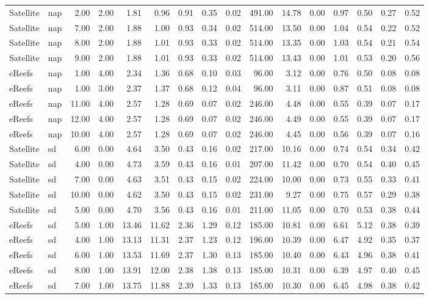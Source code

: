 \begin{table}[ht]
\begin{tabular}{llrrrrrrrrrrrrrr}
  Satellite & nap & 2.00 & 2.00 & 1.81 & 0.96 & 0.91 & 0.35 & 0.02 & 491.00 & 14.78 & 0.00 & 0.97 & 0.50 & 0.27 & 0.52 \\ 
  Satellite & nap & 7.00 & 2.00 & 1.88 & 1.00 & 0.93 & 0.34 & 0.02 & 514.00 & 13.50 & 0.00 & 1.04 & 0.54 & 0.22 & 0.52 \\ 
  Satellite & nap & 8.00 & 2.00 & 1.88 & 1.01 & 0.93 & 0.33 & 0.02 & 514.00 & 13.35 & 0.00 & 1.03 & 0.54 & 0.21 & 0.54 \\ 
  Satellite & nap & 9.00 & 2.00 & 1.88 & 1.01 & 0.93 & 0.33 & 0.02 & 514.00 & 13.43 & 0.00 & 1.01 & 0.53 & 0.20 & 0.56 \\ 
  eReefs & nap & 1.00 & 4.00 & 2.34 & 1.36 & 0.68 & 0.10 & 0.03 & 96.00 & 3.12 & 0.00 & 0.76 & 0.50 & 0.08 & 0.08 \\ 
  eReefs & nap & 1.00 & 3.00 & 2.37 & 1.37 & 0.68 & 0.12 & 0.04 & 96.00 & 3.11 & 0.00 & 0.87 & 0.51 & 0.08 & 0.08 \\ 
  eReefs & nap & 11.00 & 4.00 & 2.57 & 1.28 & 0.69 & 0.07 & 0.02 & 246.00 & 4.48 & 0.00 & 0.55 & 0.39 & 0.07 & 0.17 \\ 
  eReefs & nap & 12.00 & 4.00 & 2.57 & 1.28 & 0.69 & 0.07 & 0.02 & 246.00 & 4.49 & 0.00 & 0.55 & 0.39 & 0.07 & 0.17 \\ 
  eReefs & nap & 10.00 & 4.00 & 2.57 & 1.28 & 0.69 & 0.07 & 0.02 & 246.00 & 4.45 & 0.00 & 0.56 & 0.39 & 0.07 & 0.16 \\ 
   \midrule
Satellite & sd & 6.00 & 0.00 & 4.64 & 3.50 & 0.43 & 0.16 & 0.02 & 217.00 & 10.16 & 0.00 & 0.74 & 0.54 & 0.34 & 0.42 \\ 
  Satellite & sd & 4.00 & 0.00 & 4.73 & 3.59 & 0.43 & 0.16 & 0.01 & 207.00 & 11.42 & 0.00 & 0.70 & 0.54 & 0.40 & 0.45 \\ 
  Satellite & sd & 7.00 & 0.00 & 4.63 & 3.51 & 0.43 & 0.15 & 0.02 & 224.00 & 10.00 & 0.00 & 0.73 & 0.55 & 0.33 & 0.41 \\ 
  Satellite & sd & 10.00 & 0.00 & 4.62 & 3.50 & 0.43 & 0.15 & 0.02 & 231.00 & 9.27 & 0.00 & 0.75 & 0.57 & 0.29 & 0.38 \\ 
  Satellite & sd & 5.00 & 0.00 & 4.70 & 3.56 & 0.43 & 0.16 & 0.01 & 211.00 & 11.05 & 0.00 & 0.70 & 0.53 & 0.38 & 0.44 \\ 
  eReefs & sd & 5.00 & 1.00 & 13.46 & 11.62 & 2.36 & 1.29 & 0.12 & 185.00 & 10.81 & 0.00 & 6.61 & 5.12 & 0.38 & 0.39 \\ 
  eReefs & sd & 4.00 & 1.00 & 13.13 & 11.31 & 2.37 & 1.23 & 0.12 & 196.00 & 10.39 & 0.00 & 6.47 & 4.92 & 0.35 & 0.37 \\ 
  eReefs & sd & 6.00 & 1.00 & 13.53 & 11.69 & 2.37 & 1.30 & 0.13 & 185.00 & 10.40 & 0.00 & 6.43 & 4.96 & 0.38 & 0.41 \\ 
  eReefs & sd & 8.00 & 1.00 & 13.91 & 12.00 & 2.38 & 1.38 & 0.13 & 185.00 & 10.31 & 0.00 & 6.39 & 4.97 & 0.40 & 0.45 \\ 
  eReefs & sd & 7.00 & 1.00 & 13.75 & 11.88 & 2.39 & 1.33 & 0.13 & 185.00 & 10.30 & 0.00 & 6.45 & 4.98 & 0.38 & 0.42 \\ 
   \bottomrule
\end{tabular}
\endgroup
\end{table}
